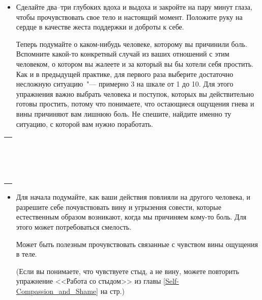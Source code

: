 \begin{itemize}
	\item Сделайте два--три глубоких вдоха и выдоха и закройте на пару минут глаза, чтобы прочувствовать свое тело и настоящий момент. Положите руку на сердце в качестве жеста поддержки и доброты к себе.
	
	\itemWritingHand Теперь подумайте о каком-нибудь человеке, которому вы причинили боль. Вспомните какой-то конкретный случай из ваших отношений с этим человеком, о котором вы жалеете и за который вы бы хотели себя простить. Как и в предыдущей практике, для первого раза выберите достаточно несложную ситуацию~"--- примерно 3 на шкале от 1 до 10. Для этого упражнения важно выбрать человека и поступок, которых вы действительно готовы простить, потому что понимаете, что остающиеся ощущения гнева и вины причиняют вам лишнюю боль. Не спешите, найдите именно ту ситуацию, с которой вам нужно поработать.	
\end{itemize}

\setlength{\extrarowheight}{2mm}
\begin{tabularx}{\textwidth}{X}
	\\
	\arrayrulecolor{gray}\hline\\
	\hline\\
	\hline\\
	\hline\\
	\hline\\
	\hline\\	
	\hline\\
	\hline\\
	\hline\\
	\hline\\
	\hline\\
	\hline\\
	\hline\\
	\hline\\
	\hline\\
	\hline\\
\end{tabularx}
\setlength{\extrarowheight}{0mm}



\begin{itemize}
	\item Для начала подумайте, как ваши действия повлияли на другого человека, и разрешите себе почувствовать вину и угрызения совести, которые естественным образом возникают, когда мы причиняем кому-то боль. Для этого может потребоваться смелость. 

	Может быть полезным прочувствовать связанные с чувством вины ощущения в теле.
	
	(Если вы понимаете, что чувствуете стыд, а не вину, можете повторить упражнение <<Работа со стыдом>> из главы \ref{Self-Compassion_and_Shame} на стр.\:\pageref{IP:Working_with_Shame})
\end{itemize}

